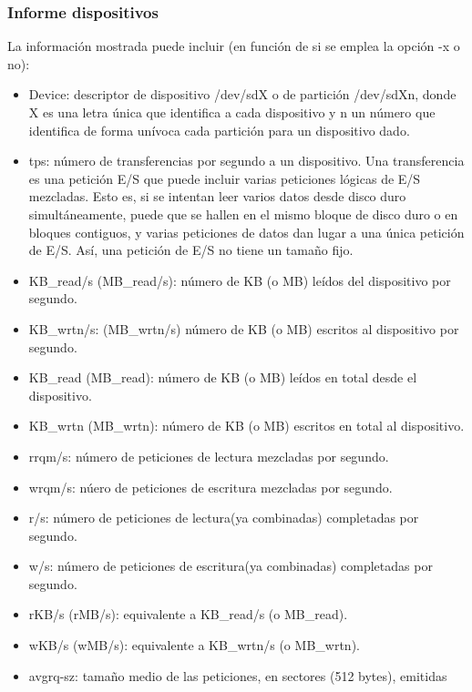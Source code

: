\documentclass[a4paper,10pt]{article}
\renewcommand{\texttt}[2][black!60]{\textcolor{#1}{\ttfamily #2}}
\begin{document}
\subsubsection{Informe dispositivos}
\label{optdisp}
La información mostrada puede incluir (en función de si se emplea la opción \texttt{-x} o no):
\begin{itemize}
 \item{\texttt{Device}}: descriptor de dispositivo \texttt{/dev/sdX} o de partición \texttt{/dev/sdXn}, donde \texttt{X} es una
 letra única que identifica a cada dispositivo y \texttt{n} un número que identifica de forma unívoca cada partición para un
 dispositivo dado.
 \item{\texttt{tps}}: número de transferencias por segundo a un dispositivo. Una transferencia es una petición E/S que puede
 incluir varias peticiones lógicas de E/S mezcladas. Esto es, si se intentan leer varios datos desde disco duro simultáneamente,
 puede que se hallen en el mismo bloque de disco duro o en bloques contiguos, y varias peticiones de datos dan lugar a una única
 petición de E/S. Así, una petición de E/S no tiene un tamaño fijo.
 \item{\texttt{KB\_read/s} (\texttt{MB\_read/s}}): número de KB (o MB) leídos del dispositivo por segundo.
 \item{\texttt{KB\_wrtn/s}}: (\texttt{MB\_wrtn/s}) número de KB (o MB) escritos al dispositivo por segundo.
 \item{\texttt{KB\_read}} (\texttt{MB\_read}): número de KB (o MB) leídos en total desde el dispositivo.
 \item{\texttt{KB\_wrtn}} (\texttt{MB\_wrtn}): número de KB (o MB) escritos en total al dispositivo.
 \item{\texttt{rrqm/s}}: número de peticiones de lectura mezcladas por segundo.
 \item{\texttt{wrqm/s}}: núero de peticiones de escritura mezcladas por segundo.
 \item{\texttt{r/s}}: número de peticiones de lectura(ya combinadas) completadas por segundo.
 \item{\texttt{w/s}}: número de peticiones de escritura(ya combinadas) completadas por segundo.
 \item{\texttt{rKB/s}} (\texttt{rMB/s}): equivalente a \texttt{KB\_read/s} (o \texttt{MB\_read}).
 \item{\texttt{wKB/s}} (\texttt{wMB/s}): equivalente a \texttt{KB\_wrtn/s} (o \texttt{MB\_wrtn}).
 \item{\texttt{avgrq-sz}}: tamaño medio de las peticiones, en sectores (512 bytes), emitidas

\end{itemize}
\end{document}
